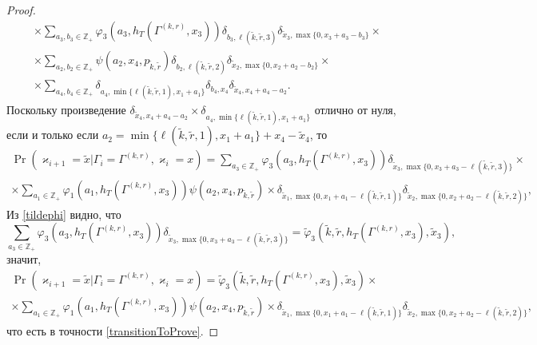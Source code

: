 \documentclass[a4paper,12pt,russian]{extarticle}
\begin{document}
\begin{proof}
\begin{multline*}
\times \sum_{a_3,b_3 \in \mathbb{Z}_+}  \varphi_3(a_3,h_T(\Gamma^{(k,r)},x_3)) \delta_{b_3,\ell(\tilde{k},\tilde{r},3)}  \delta_{\tilde{x}_3,\max{\{0,x_3+a_3-b_3\}}} \times \\
\times \sum_{a_2,b_2 \in \mathbb{Z}_+}  \psi(a_2,x_4, p_{\tilde{k},\tilde{r}})   \delta_{b_2,\ell(\tilde{k},\tilde{r},2)}   \delta_{\tilde{x}_2,\max{\{0,x_2+a_2-b_2\}}} \times \\
\times \sum_{a_4,b_4 \in \mathbb{Z}_+}  \delta_{a_4,\min{\{\ell(\tilde{k},\tilde{r},1), x_1+a_1}\}}   \delta_{b_4,x_4} \delta_{\tilde{x}_4,x_4+a_4-a_2}.
\end{multline*}
Поскольку произведение $\delta_{\tilde{x}_4,x_4+a_4-a_2}\times \delta_{a_4,\min{\{\ell(\tilde{k},\tilde{r},1), x_1+a_1}\}}$ отлично от нуля, если и только если $a_2 = \min{\{\ell(\tilde{k},\tilde{r},1), x_1+a_1}\} +x_4-\tilde{x}_4$, то
\begin{multline*}
\Pr (\varkappa_{i+1}=\tilde{x}|\Gamma_{i}=\Gamma^{(k,r)},\varkappa_i=x)=\sum_{a_3\in \mathbb{Z}_+}  \varphi_3(a_3,h_T(\Gamma^{(k,r)},x_3))  \delta_{\tilde{x}_3,\max{\{0,x_3+a_3-\ell(\tilde{k},\tilde{r},3)\}}} \times \\
\times\sum_{a_1 \in \mathbb{Z}_+} \varphi_1(a_1,h_T(\Gamma^{(k,r)},x_3))  \psi(a_2,x_4, p_{\tilde{k},\tilde{r}}) \times  \delta_{\tilde{x}_1,\max{\{0,x_1+a_1-\ell(\tilde{k},\tilde{r},1)\}}}  \delta_{\tilde{x}_2,\max{\{0,x_2+a_2-\ell(\tilde{k},\tilde{r},2)\}}},
\end{multline*}
Из \eqref{tildephi} видно, что
\begin{equation*}
\sum_{a_3\in \mathbb{Z}_+}  \varphi_3(a_3,h_T(\Gamma^{(k,r)},x_3))  \delta_{\tilde{x}_3,\max{\{0,x_3+a_3-\ell(\tilde{k},\tilde{r},3)\}}} = \tilde{\varphi}_3(\tilde{k},\tilde{r},h_T(\Gamma^{(k,r)},x_3),\tilde{x}_3),
\end{equation*}
значит,
\begin{multline*}
\Pr (\varkappa_{i+1}=\tilde{x}|\Gamma_{i}=\Gamma^{(k,r)},\varkappa_i=x)
=\tilde{\varphi}_3(\tilde{k},\tilde{r},h_T(\Gamma^{(k,r)},x_3),\tilde{x}_3) \times\\
\times \sum_{a_1 \in \mathbb{Z}_+} \varphi_1(a_1,h_T(\Gamma^{(k,r)},x_3))  \psi(a_2,x_4, p_{\tilde{k},\tilde{r}}) \times \delta_{\tilde{x}_1,\max{\{0,x_1+a_1-\ell(\tilde{k},\tilde{r},1)\}}}  \delta_{\tilde{x}_2,\max{\{0,x_2+a_2-\ell(\tilde{k},\tilde{r},2)\}}},
\end{multline*}
что есть в точности \eqref{transitionToProve}.
\end{proof}
\end{document}
